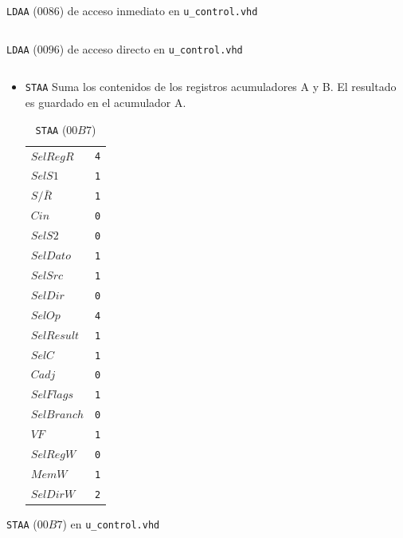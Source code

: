 \documentclass{IEEEtran}
\newenvironment{code}{\captionsetup{type=listing}}{}
\begin{document}
\begin{code}
\caption{\texttt{LDAA} ($0086$) de acceso inmediato en \texttt{u\_control.vhd}}
\inputminted[firstline=53, lastline=71]{vhdl}{../Risc/u_control.vhd}
\end{code}
\begin{code}
\caption{\texttt{LDAA} ($0096$) de acceso directo en \texttt{u\_control.vhd}}
\inputminted[firstline=93, lastline=111]{vhdl}{../Risc/u_control.vhd}
\end{code}
\begin{itemize}
\item \texttt{STAA}
Suma los contenidos de los registros acumuladores A y B. El resultado es guardado en el acumulador A.
\begin{table}[htbp]
\caption{\texttt{STAA} (\(00B7\))}
\centering
\begin{tabular}{ll}
\hline
\(SelRegR\) & \texttt{4}\\
\(SelS1\) & \texttt{1}\\
\(S/\bar{R}\) & \texttt{1}\\
\(Cin\) & \texttt{0}\\
\(SelS2\) & \texttt{0}\\
\(SelDato\) & \texttt{1}\\
\(SelSrc\) & \texttt{1}\\
\(SelDir\) & \texttt{0}\\
\(SelOp\) & \texttt{4}\\
\(SelResult\) & \texttt{1}\\
\(SelC\) & \texttt{1}\\
\(Cadj\) & \texttt{0}\\
\(SelFlags\) & \texttt{1}\\
\(SelBranch\) & \texttt{0}\\
\(VF\) & \texttt{1}\\
\(SelRegW\) & \texttt{0}\\
\(MemW\) & \texttt{1}\\
\(SelDirW\) & \texttt{2}\\
\hline
\end{tabular}
\end{table}
\end{itemize}
\begin{code}
\caption{\texttt{STAA} ($00B7$) en \texttt{u\_control.vhd}}
\inputminted[firstline=133, lastline=151]{vhdl}{../Risc/u_control.vhd}
\end{code}
\end{document}
